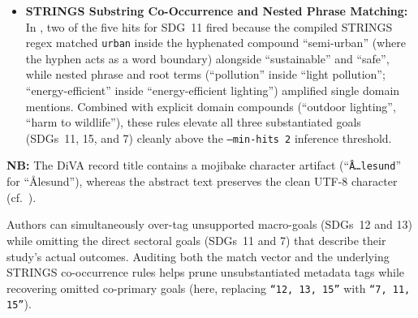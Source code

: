 \begin{casestudySection}
\begin{itemize}
    \item \textbf{STRINGS Substring Co-Occurrence and Nested Phrase Matching:} In , two of the five hits for \gls{SDG}~11 fired because the compiled STRINGS regex matched \texttt{urban} inside the hyphenated compound \enquote{semi-urban} (where the hyphen acts as a word boundary) alongside \enquote{sustainable} and \enquote{safe}, while nested phrase and root terms (\enquote{pollution} inside \enquote{light pollution}; \enquote{energy-efficient} inside \enquote{energy-efficient lighting}) amplified single domain mentions. Combined with explicit domain compounds (\enquote{outdoor lighting}, \enquote{harm to wildlife}), these rules elevate all three substantiated goals (\glspl{SDG}~11, 15, and 7) cleanly above the \texttt{--min-hits 2} inference threshold.
\end{itemize}

\textbf{NB:} The \gls{DiVA} record title contains a mojibake character artifact (\enquote{\texttt{Å…lesund}} for \enquote{Ålesund}), whereas the abstract text preserves the clean UTF-8 character (cf.\ ).
\end{casestudySection}

\begin{takeaway}
Authors can simultaneously over-tag unsupported macro-goals (\glspl{SDG}~12 and 13) while omitting the direct sectoral goals (\glspl{SDG}~11 and 7) that describe their study's actual outcomes. Auditing both the match vector and the underlying STRINGS co-occurrence rules helps prune unsubstantiated metadata tags while recovering omitted co-primary goals (here, replacing \texttt{\enquote{12, 13, 15}} with \texttt{\enquote{7, 11, 15}}).
\end{takeaway}

